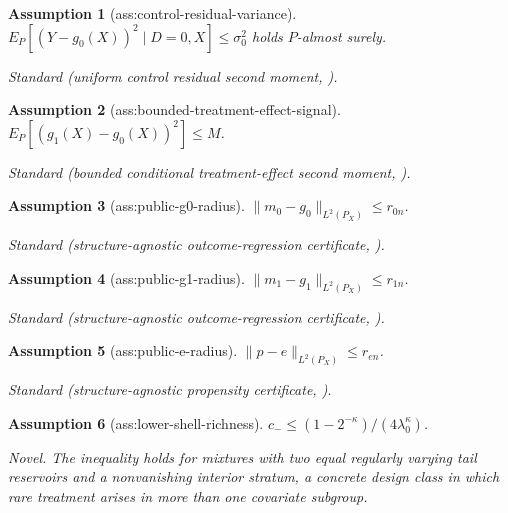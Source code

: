 \documentclass{article}
\newtheorem{assumption}{Assumption}
\begin{document}
\begin{assumption}[ass:control-residual-variance]\label{ass:control-residual-variance}
\(E_P[(Y-g_0(X))^2\mid D=0,X]\le\sigma_0^2\) holds \(P\)-almost surely.
\par\smallskip\noindent\emph{Standard} (uniform control residual second moment, \cite{Dorn2025WeakOverlapTStatistics}).
\end{assumption}

\begin{assumption}[ass:bounded-treatment-effect-signal]\label{ass:bounded-treatment-effect-signal}
\(E_P[(g_1(X)-g_0(X))^2]\le M\).
\par\smallskip\noindent\emph{Standard} (bounded conditional treatment-effect second moment, \cite{ChernozhukovEtAl2018DML}).
\end{assumption}

\begin{assumption}[ass:public-g0-radius]\label{ass:public-g0-radius}
\(\lVert m_0-g_0\rVert_{L^2(P_X)}\le r_{0n}\).
\par\smallskip\noindent\emph{Standard} (structure-agnostic outcome-regression certificate, \cite{JinSyrgkanis2024StructureAgnosticDR}).
\end{assumption}

\begin{assumption}[ass:public-g1-radius]\label{ass:public-g1-radius}
\(\lVert m_1-g_1\rVert_{L^2(P_X)}\le r_{1n}\).
\par\smallskip\noindent\emph{Standard} (structure-agnostic outcome-regression certificate, \cite{JinSyrgkanis2024StructureAgnosticDR}).
\end{assumption}

\begin{assumption}[ass:public-e-radius]\label{ass:public-e-radius}
\(\lVert p-e\rVert_{L^2(P_X)}\le r_{en}\).
\par\smallskip\noindent\emph{Standard} (structure-agnostic propensity certificate, \cite{BonviniKennedyDukesBalakrishnan2024StructureAgnosticATE}).
\end{assumption}

\begin{assumption}[ass:lower-shell-richness]\label{ass:lower-shell-richness}
\(c_-\le (1-2^{-\kappa})/(4\lambda_0^{\kappa})\).
\par\smallskip\noindent\emph{Novel.} The inequality holds for mixtures with two equal regularly varying tail reservoirs and a nonvanishing interior stratum, a concrete design class in which rare treatment arises in more than one covariate subgroup.
\end{assumption}
\end{document}
